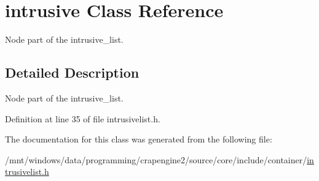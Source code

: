 \hypertarget{classintrusive}{}\section{intrusive Class Reference}
\label{classintrusive}


Node part of the intrusive\+\_\+list.  




\subsection{Detailed Description}
Node part of the intrusive\+\_\+list. 

Definition at line 35 of file intrusivelist.\+h.



The documentation for this class was generated from the following file\+:\begin{DoxyCompactItemize}
\item 
/mnt/windows/data/programming/crapengine2/source/core/include/container/\hyperlink{intrusivelist_8h}{intrusivelist.\+h}\end{DoxyCompactItemize}
